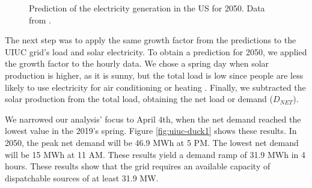 \begin{figure}[htbp!]
    \centering
    \hfill
    \caption{Prediction of the electricity generation in the \gls{US} for 2050. Data from \cite{us_energy_information_administration_electric_2020}.}
    \label{fig:prediction}
\end{figure}

The next step was to apply the same growth factor from the predictions to the \gls{UIUC} grid's load and solar electricity.
To obtain a prediction for 2050, we applied the growth factor to the hourly data.
We chose a spring day when solar production is higher, as it is sunny, but the total load is low since people are less likely to use electricity for air conditioning or heating \cite{us_department_of_energy_confronting_2017}.
Finally, we subtracted the solar production from the total load, obtaining the net load or demand ($D_{NET}$).

We narrowed our analysis' focus to April 4th, when the net demand reached the lowest value in the 2019's spring.
Figure \ref{fig:uiuc-duck1} shows these results.
In 2050, the peak net demand will be 46.9 MWh at 5 PM.
The lowest net demand will be 15 MWh at 11 AM.
These results yield a demand ramp of 31.9 MWh in 4 hours.
These results show that the grid requires an available capacity of dispatchable sources of at least 31.9 MW.


